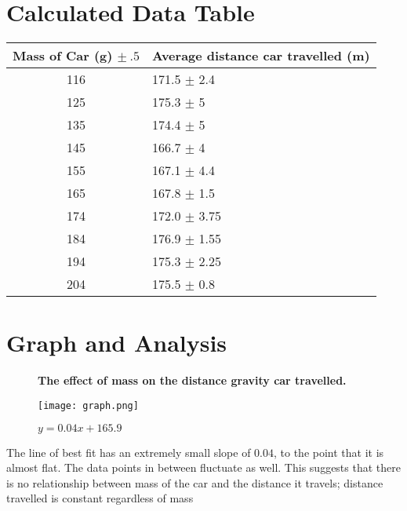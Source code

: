 \documentclass[12pt]{article}
\begin{document}
\section{Calculated Data Table}
\begin{table}[H]
	\centering
	\begin{tabularx}{0.75\textwidth}{|c|X|}
		\hline
		Mass of Car (g) \(\pm\ .5\)  & Average distance car travelled (m) \\ \hline
		116             & 171.5 \(\pm\) 2.4                              \\ \hline
		125             & 175.3 \(\pm\) 5                                \\ \hline
		135             & 174.4 \(\pm\) 5                                \\ \hline
		145             & 166.7 \(\pm\) 4                                \\ \hline
		155             & 167.1 \(\pm\) 4.4                              \\ \hline
		165             & 167.8 \(\pm\) 1.5                              \\ \hline
		174             & 172.0 \(\pm\) 3.75                             \\ \hline
		184             & 176.9 \(\pm\) 1.55                             \\ \hline
		194             & 175.3 \(\pm\) 2.25                             \\ \hline
		204             & 175.5 \(\pm\) 0.8                              \\ \hline
	\end{tabularx}
\end{table}

\section{Graph and Analysis}

\begin{figure}[H]
	\centering
	\textbf{The effect of mass on the distance gravity car travelled.}\medskip\par
	\texttt{[image: graph.png]}
	\caption{\(y=0.04x+165.9\) }
\end{figure}

The line of best fit has an extremely small slope of \(0.04\), to the point that it is almost flat. The data points in between fluctuate as well. This suggests that there is no relationship between mass of the car and the distance it travels; distance travelled is constant regardless of mass
\end{document}
